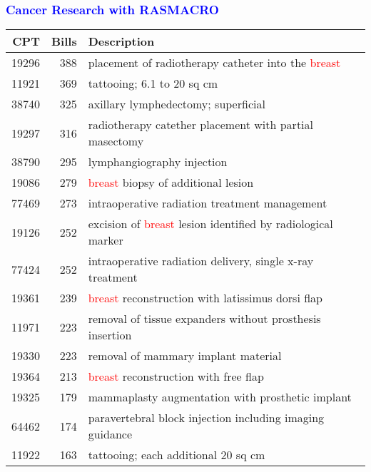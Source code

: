 \documentclass[11pt,pdftex,dvipsnames,usenames]{beamer}
\begin{document}
\begin{frame}[fragile]\frametitle{\bf\textcolor{blue}{Cancer Research with RASMACRO}}

\begin{center}
\begin{tabular}{rr|l}
CPT & Bills & Description \\ \hline
19296 & 388 & placement of radiotherapy catheter into the \textcolor{red}{breast} \\
11921 & 369 & tattooing; 6.1 to 20 sq cm \\
38740 & 325 & axillary lymphedectomy; superficial \\
19297 & 316 & radiotherapy catether placement with partial masectomy \\
38790 & 295 & lymphangiography injection \\
19086 & 279 & \textcolor{red}{breast} biopsy of additional lesion \\
77469 & 273 & intraoperative radiation treatment management \\
19126 & 252 & excision of \textcolor{red}{breast} lesion identified by 
radiological marker \\
77424 & 252 & intraoperative radiation delivery, single x-ray treatment \\
19361 & 239 & \textcolor{red}{breast} reconstruction with latissimus dorsi flap \\
11971 & 223 & removal of tissue expanders without prosthesis insertion \\
19330 & 223 & removal of mammary implant material \\
19364 & 213 & \textcolor{red}{breast} reconstruction with free flap \\
19325 & 179 & mammaplasty augmentation with prosthetic implant \\
64462 & 174 & paravertebral block injection including imaging guidance \\
11922 & 163 & tattooing; each additional 20 sq cm
\end{tabular}
\end{center}

\end{frame}
\end{document}
